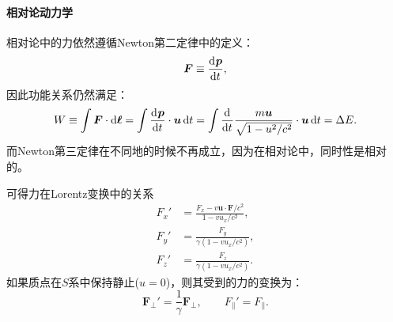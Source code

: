 \paragraph{相对论动力学}

相对论中的力依然遵循Newton第二定律中的定义：
\[
    \bm F\equiv\frac{\mathrm{d}^{{}}\bm p}{\mathrm{d}{t}^{{}}},
\]
因此功能关系仍然满足：
\begin{equation}
    W\equiv\int\bm F\cdot\mathop{}\!\mathrm{d}\bm\ell=\int\frac{\mathrm{d}^{{}}\bm p}{\mathrm{d}{t}^{{}}}\cdot\bm u\mathop{}\!\mathrm{d} t=\int\frac{\mathrm{d}^{{}}}{\mathrm{d}{t}^{{}}}\frac{m\bm u}{\sqrt{1-u^2/c^2}}\cdot\bm u\mathop{}\!\mathrm{d} t=\Delta E.
\end{equation}
而Newton第三定律在不同地的时候不再成立，因为在相对论中，同时性是相对的。

可得力在Lorentz变换中的关系
\begin{subequations}
    \begin{align}
        F_x'&=\frac{F_x-v\bm u\cdot\bm F/c^2}{1-vu_x/c^2},\\
        F_y'&=\frac{F_y}{\gamma(1-vu_x/c^2)},\\
        F_z'&=\frac{F_z}{\gamma(1-vu_x/c^2)}.
    \end{align}
\end{subequations}
如果质点在$S$系中保持静止($u=0$)，则其受到的力的变换为：
\begin{equation}
    \bm F_\perp'=\frac1\gamma\bm F_\perp,\qquad F_\parallel'=F_\parallel.
\end{equation}

